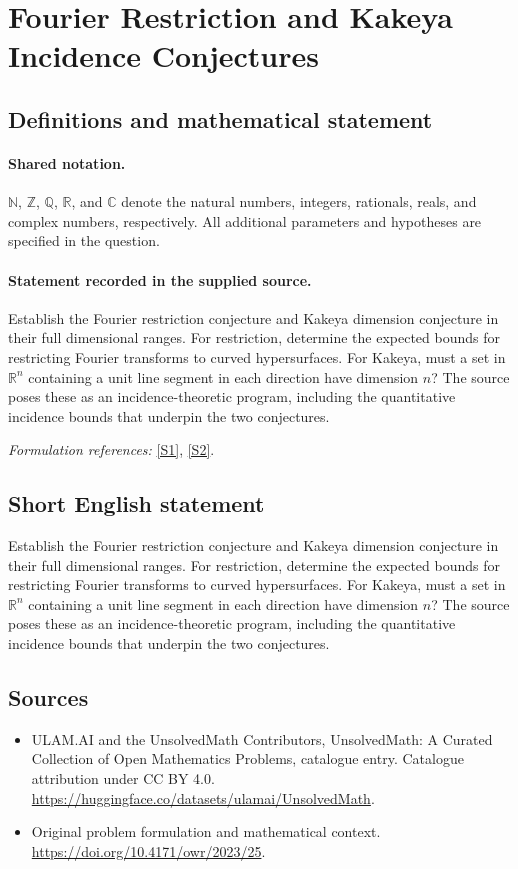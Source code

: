 \documentclass[11pt]{article}
\newcommand{\sref}[2]{\hyperlink{source:#1:#2}{[S#2]}}
\begin{document}
\section{Fourier Restriction and Kakeya Incidence Conjectures}\label{statement}

\subsection{Definitions and mathematical statement}

\paragraph{Shared notation.}$\mathbb N$, $\mathbb Z$, $\mathbb Q$, $\mathbb R$, and $\mathbb C$ denote the natural numbers, integers, rationals, reals, and complex numbers, respectively. All additional parameters and hypotheses are specified in the question.


\paragraph{Statement recorded in the supplied source.}
Establish the Fourier restriction conjecture and Kakeya dimension conjecture in their full dimensional ranges. For restriction, determine the expected bounds for restricting Fourier transforms to curved hypersurfaces. For Kakeya, must a set in $\mathbb R^n$ containing a unit line segment in each direction have dimension $n$? The source poses these as an incidence-theoretic program, including the quantitative incidence bounds that underpin the two conjectures.
\par\smallskip\textit{Formulation references:} \sref{statement}{1}, \sref{statement}{2}.
\subsection{Short English statement}
Establish the Fourier restriction conjecture and Kakeya dimension conjecture in their full dimensional ranges. For restriction, determine the expected bounds for restricting Fourier transforms to curved hypersurfaces. For Kakeya, must a set in $\mathbb R^n$ containing a unit line segment in each direction have dimension $n$? The source poses these as an incidence-theoretic program, including the quantitative incidence bounds that underpin the two conjectures.
\subsection{Sources}
\begin{itemize}
\item[\hypertarget{source:statement:1}{S1}] ULAM.AI and the UnsolvedMath Contributors, UnsolvedMath: A Curated Collection of Open Mathematics Problems, catalogue entry. Catalogue attribution under CC BY 4.0.
\url{https://huggingface.co/datasets/ulamai/UnsolvedMath}.
\item[\hypertarget{source:statement:2}{S2}] Original problem formulation and mathematical context.
\url{https://doi.org/10.4171/owr/2023/25}.
\end{itemize}
\label{end:statement}
\end{document}
